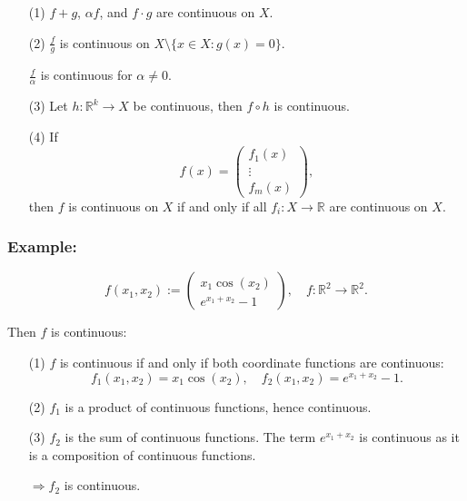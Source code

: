 \documentclass{article}
\begin{document}
\begin{enumerate}
    \item[(1)] \( f + g \), \( \alpha f \), and \( f \cdot g \) are continuous on \( X \).
    
    \item[(2)] \(\frac{f}{g}\) is continuous on \( X \setminus \{ x \in X : g(x) = 0 \}\).
    
    \(\frac{f}{\alpha}\) is continuous for \( \alpha \neq 0 \).
    
    \item[(3)] Let \( h: \mathbb{R}^k \rightarrow X \) be continuous, then \( f \circ h \) is continuous.
    
    \item[(4)] If 
    \[
    f(x) = \begin{pmatrix}
    f_1(x) \\
    \vdots \\
    f_m(x)
    \end{pmatrix},
    \]
    then \( f \) is continuous on \( X \) if and only if all \( f_i: X \rightarrow \mathbb{R} \) are continuous on \( X \).
\end{enumerate}

\subsubsection*{Example:}
\[
f(x_1, x_2) := \begin{pmatrix}
x_1 \cos(x_2) \\
e^{x_1 + x_2} - 1
\end{pmatrix}, \quad f: \mathbb{R}^2 \rightarrow \mathbb{R}^2.
\]

Then \( f \) is continuous:

\begin{enumerate}
    \item[(1)] \( f \) is continuous if and only if both coordinate functions are continuous:
    \[
    f_1(x_1, x_2) = x_1 \cos(x_2), \quad f_2(x_1, x_2) = e^{x_1 + x_2} - 1.
    \]
    
    \item[(2)] \( f_1 \) is a product of continuous functions, hence continuous.
    
    \item[(3)] \( f_2 \) is the sum of continuous functions. The term \( e^{x_1 + x_2} \) is continuous as it is a composition of continuous functions.
    
    \(\Rightarrow f_2 \) is continuous.
\end{enumerate}
\end{document}
